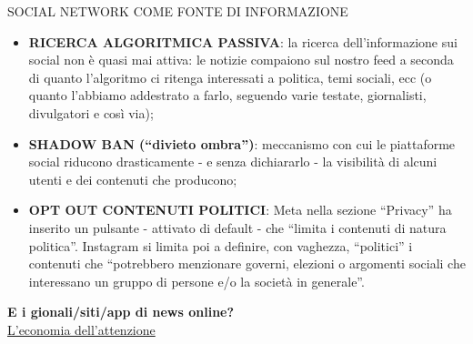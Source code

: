 \documentclass[aspectratio=1610]{beamer}
\begin{document}
\begin{frame}{SOCIAL NETWORK COME FONTE DI INFORMAZIONE}
    \begin{itemize}
        \justifying
        \item \textbf{RICERCA ALGORITMICA PASSIVA}: la ricerca dell’informazione sui social non è quasi mai attiva: 
        le notizie compaiono sul nostro feed a seconda di quanto l’algoritmo ci ritenga interessati a politica, 
        temi sociali, ecc (o quanto l’abbiamo addestrato a farlo, seguendo varie testate, giornalisti, 
        divulgatori e così via);
        \pause
        \item \textbf{SHADOW BAN (``divieto ombra'')}: meccanismo con cui le piattaforme social 
        riducono drasticamente - e senza dichiararlo - la visibilità di alcuni utenti e dei contenuti 
        che producono;
        \pause
        \item \textbf{OPT OUT CONTENUTI POLITICI}: Meta nella sezione “Privacy” ha inserito un pulsante 
        - attivato di default - che ``limita i contenuti di natura politica''. Instagram si limita poi a 
        definire, con vaghezza, ``politici'' i contenuti che ``potrebbero menzionare governi, elezioni o 
        argomenti sociali che interessano un gruppo di persone e/o la società in generale''.
    \end{itemize}
    \bigskip
    \tiny{\textbf{E i gionali/siti/app di news online?}}\\
    \tiny{\href{https://www.feltrinellieducation.it/magazine/l-economia-dell-attenzione-e-il-paradosso-che-sta-uccidendo-i-giornali}{L’economia dell’attenzione}}\\
\end{frame}
\end{document}
